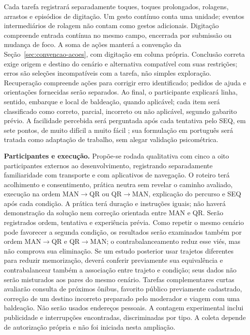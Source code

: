 Cada tarefa registrará separadamente toques, toques prolongados, rolagens, arrastos e episódios de digitação. Um gesto contínuo conta uma unidade; eventos intermediários de rolagem não contam como gestos adicionais. Digitação compreende entrada contínua no mesmo campo, encerrada por submissão ou mudança de foco. A soma de ações manterá a convenção da Seção~\ref{sec:convencao-acoes}, com digitação em coluna própria. Conclusão correta exige origem e destino do cenário e alternativa compatível com suas restrições; erros são seleções incompatíveis com a tarefa, não simples exploração. Recuperação compreende ações para corrigir erro identificado; pedidos de ajuda e orientações fornecidas serão separados. Ao final, o participante explicará linha, sentido, embarque e local de baldeação, quando aplicável; cada item será classificado como correto, parcial, incorreto ou não aplicável, segundo gabarito prévio. A facilidade percebida será perguntada após cada tentativa pelo SEQ, em sete pontos, de muito difícil a muito fácil \citep{sauro2012seq}; sua formulação em português será tratada como adaptação de trabalho, sem alegar validação psicométrica.

\textbf{Participantes e execução.} Propõe-se rodada qualitativa com cinco a oito participantes externos ao desenvolvimento, registrando separadamente familiaridade com transporte e com aplicativos de navegação. O roteiro terá acolhimento e consentimento, prática neutra sem revelar o caminho avaliado, execução na ordem MAN$\rightarrow$QR ou QR$\rightarrow$MAN, explicação do percurso e SEQ após cada condição. A prática terá duração e instruções iguais; não haverá demonstração da solução nem correção orientada entre MAN e QR. Serão registrados ordem, tentativa e experiência prévia. Como repetir o mesmo cenário pode favorecer a segunda condição, os resultados serão examinados também por ordem MAN$\rightarrow$QR e QR$\rightarrow$MAN; o contrabalanceamento reduz esse viés, mas não comprova sua eliminação. Se um estudo posterior usar trajetos diferentes para reduzir memorização, deverá conferir previamente sua equivalência e contrabalancear também a associação entre trajeto e condição; seus dados não serão misturados aos pares do mesmo cenário. Tarefas complementares curtas avaliarão consulta de próximos ônibus, favorito público previamente cadastrado, correção de um destino incorreto preparado pelo moderador e viagem com uma baldeação. Não serão usados endereços pessoais. A contagem experimental inclui publicidade e interrupções encontradas, discriminadas por tipo. A coleta depende de autorização própria e não foi iniciada nesta ampliação.

